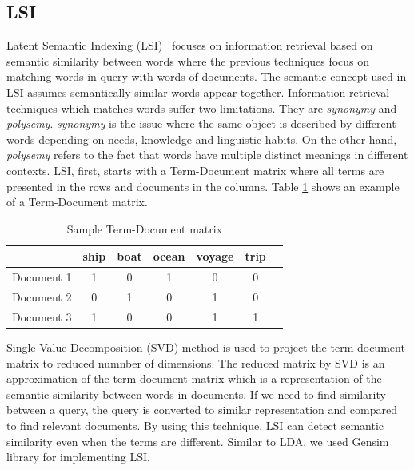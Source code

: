 \subsection{LSI}
\label{background:lsi}
Latent Semantic Indexing (LSI)~\cite{deerwester1990indexingLSI} focuses on information retrieval based on semantic similarity between words where the previous techniques focus on matching words in query with words of documents. The semantic concept used in LSI assumes semantically similar words appear together. Information retrieval techniques which matches words suffer two limitations. They are \emph{synonymy} and \emph{polysemy}. \emph{synonymy} is the issue where the same object is described by different words depending on needs, knowledge and linguistic habits. On the other hand, \emph{polysemy} refers to the fact that words have multiple distinct meanings in different contexts. LSI, first, starts with a  Term-Document matrix where all terms are presented in the rows and documents in the columns. Table \ref{tb:LSI_term_document} shows an example of a Term-Document matrix. 

\begin{table}[h]
    \centering
    \caption{Sample Term-Document matrix}
 \begin{tabular}{|c|c|c|c|c|c|c|}
    \hline
    
        & ship & boat & ocean & voyage & trip   \\
        \hline
        Document 1 & 1 & 0 & 1 & 0 & 0  \\
        Document 2 & 0 & 1 & 0 & 1 & 0    \\
        Document 3 & 1 & 0 & 0 & 1 & 1  \\
    \hline
    \end{tabular}
    
    \label{tb:LSI_term_document}
\end{table}


Single Value Decomposition (SVD) method is used to project the term-document matrix to reduced numnber of dimensions.
The reduced matrix by SVD is an approximation of the term-document matrix which is a representation of the semantic similarity between words in documents. If we need to find similarity between a query, the query is converted to similar representation and compared to find relevant documents. By using this technique, LSI can detect semantic similarity even when the terms are different. Similar to LDA, we used Gensim \cite{gensim} library for implementing LSI.   



